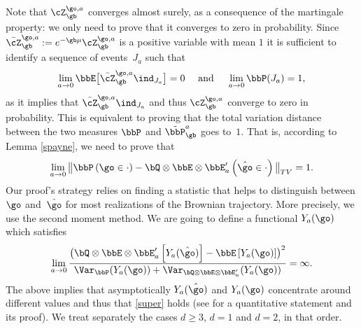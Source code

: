Note that $\cZ_{\gb}^{\go,a}$ converges almost surely, as a consequence
of the martingale property: we only need to prove that
it converges to zero in probability.
Since~$\bar \cZ_{\gb}^{\go,a} := e^{-\gb \mu} \cZ_{\gb}^{\go,a}$ is a positive variable with mean $1$ it is sufficient to identify a sequence of events~$J_a$ such that
\begin{equation}\label{lapremiere}
\lim_{a\to 0}\bbE\bigl[\bar \cZ_{\gb}^{\go,a}\ind_{J_{a}}\bigr]=0 \quad \text{ and } \quad \lim_{a\to 0}\bbP({J_{a}})=1,
\end{equation}
as it implies that $\bar \cZ_{\gb}^{\go,a}\ind_{J_{a}}$ and thus $\cZ_{\gb}^{\go,a}$ converge to zero in probability.
This is equivalent to proving that the total variation distance between the two measures $\bbP$ and $\tilde \bbP_{\gb}^a$ goes to~$1$.
That is, according to Lemma \ref{spayne}, we need to prove that
\begin{equation}\label{super}
\lim_{a\to 0} \big\| \bbP\left(\go \in \cdot\right)- \bQ\otimes \bbE\otimes \bbE'_a\left(\hat \go \in \cdot\right) \big\|_{TV}=1.
\end{equation}
Our proof's strategy relies on finding a statistic that helps to distinguish between $\go$ and~$\hat \go$ for most realizations of the Brownian trajectory.
More precisely, we use the second moment method. We are going to define a functional $Y_a(\go)$ which satisfies
\begin{equation}\label{troukz}
\lim_{a\to 0}
\frac{\bigl(\bQ\otimes \bbE\otimes \bbE'_a\left[ Y_a(\hat \go)\right]-\bbE\left[ Y_a(\go)\right]\bigr)^2}{ \Var_{\bbP}(Y_a(\go))+\Var_{\bQ\otimes \bbE\otimes \bbE'_a}(Y_a(\go))}=\infty.
\end{equation}
The above implies that asymptotically $Y_a(\hat \go)$ and $Y_a(\go)$ concentrate around different values and thus that \eqref{super} holds (see \cite[Prop.\,7.12]{MCMT} for a quantitative statement and its proof).
We treat separately the cases $d\geq 3$, $d=1$ and $d=2$, in that order.

